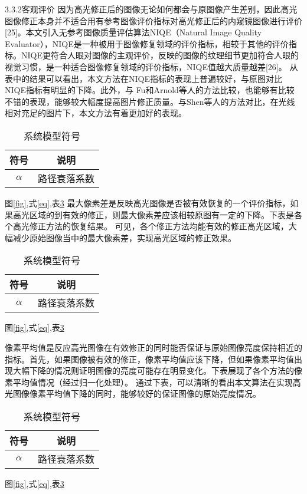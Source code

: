 \documentclass[UTF8,a4paper,12pt]{ctexart}
\newcommand{\wuhao}{\fontsize{10.5pt}{10.5pt}\selectfont}
\begin{document}
3.3.2客观评价
因为高光修正后的图像无论如何都会与原图像产生差别，因此高光图像修正本身并不适合用有参考图像评价指标对高光修正后的内窥镜图像进行评价[25]。本文引入无参考图像质量评估算法NIQE（Natural Image Quality Evaluator），NIQE是一种被用于图像修复领域的评价指标，相较于其他的评价指标。NIQE更符合人眼对图像的主观评价，反映的图像的纹理细节更加符合人眼的视觉习惯，是一种适合图像修复领域的评价指标，NIQE值越大质量越差[26]。
从表中的结果可以看出，本文方法在NIQE指标的表现上普遍较好，与原图对比NIQE指标有明显的下降。此外，与 Fu和Arnold等人的方法比较，也能够有比较不错的表现，能够较大幅度提高图片修正质量。与Shen等人的方法对比，在光线相对充足的图片下，本文方法有着更加好的表现。
\begin{table}[H] \wuhao             %
   \centering
  \caption{系统模型符号}\label{tab}
  \begin{tabular}{c|c}
    \toprule                  %
    符号 & 说明 \\
    \hline                  %
    $\alpha$ & 路径衰落系数 \\
    \bottomrule                %
  \end{tabular}
\end{table}
图\ref{fig},式\eqref{eq},表\ref{tab}
最大像素差是反映高光图像是否被有效恢复的一个评价指标，如果高光区域的到有效的修正，则最大像素差应该相较原图有一定的下降。下表是各个高光修正方法的恢复结果。
可见，各个修正方法均能有效的修正高光区域，大幅减少原始图像当中的最大像素差，实现高光区域的修正效果。
\begin{table}[H] \wuhao             %
   \centering
  \caption{系统模型符号}\label{tab}
  \begin{tabular}{c|c}
    \toprule                  %
    符号 & 说明 \\
    \hline                  %
    $\alpha$ & 路径衰落系数 \\
    \bottomrule                %
  \end{tabular}
\end{table}
图\ref{fig},式\eqref{eq},表\ref{tab}

像素平均值是反应高光图像在有效修正的同时能否保证与原始图像亮度保持相近的指标。首先，如果图像被有效的修正，像素平均值应该下降，但如果像素平均值出现大幅下降的情况则证明图像的亮度可能存在明显变化。下表展现了各个方法的像素平均值情况（经过归一化处理）。
通过下表，可以清晰的看出本文算法在实现高光图像像素平均值下降的同时，能够较好的保证图像的原始亮度情况。
\begin{table}[H] \wuhao             %
   \centering
  \caption{系统模型符号}\label{tab}
  \begin{tabular}{c|c}
    \toprule                  %
    符号 & 说明 \\
    \hline                  %
    $\alpha$ & 路径衰落系数 \\
    \bottomrule                %
  \end{tabular}
\end{table}
图\ref{fig},式\eqref{eq},表\ref{tab}
\end{document}
